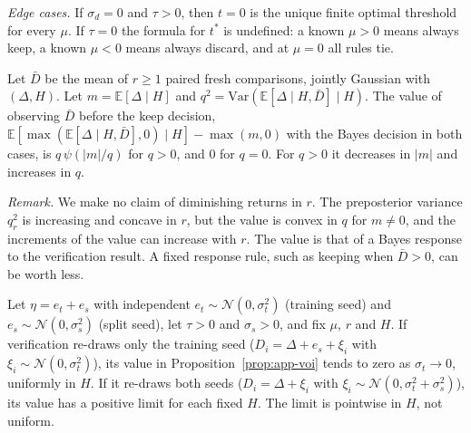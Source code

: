 \emph{Edge cases.} If $\sigma_d=0$ and $\tau>0$, then $t=0$ is the unique finite optimal threshold for every $\mu$. If $\tau=0$ the formula for $t^*$ is undefined: a known $\mu>0$ means always keep, a known $\mu<0$ means always discard, and at $\mu=0$ all rules tie.

\begin{proposition}\label{prop:app-voi}
Let $\bar D$ be the mean of $r\ge1$ paired fresh comparisons, jointly Gaussian with $(\Delta,H)$. Let $m=\mathbb{E}[\Delta\mid H]$ and $q^2=\mathrm{Var}(\mathbb{E}[\Delta\mid H,\bar D]\mid H)$. The value of observing $\bar D$ before the keep decision, $\mathbb{E}[\max(\mathbb{E}[\Delta\mid H,\bar D],0)\mid H]-\max(m,0)$ with the Bayes decision in both cases, is $q\,\psi(|m|/q)$ for $q>0$, and $0$ for $q=0$. For $q>0$ it decreases in $|m|$ and increases in $q$.
\end{proposition}

\emph{Remark.} We make no claim of diminishing returns in $r$. The preposterior variance $q_r^2$ is increasing and concave in $r$, but the value is convex in $q$ for $m\neq0$, and the increments of the value can increase with $r$. The value is that of a Bayes response to the verification result. A fixed response rule, such as keeping when $\bar D>0$, can be worth less.

\begin{proposition}\label{prop:app-split}
Let $\eta=e_t+e_s$ with independent $e_t\sim\mathcal{N}(0,\sigma_t^2)$ (training seed) and $e_s\sim\mathcal{N}(0,\sigma_s^2)$ (split seed), let $\tau>0$ and $\sigma_s>0$, and fix $\mu$, $r$ and $H$. If verification re-draws only the training seed ($D_i=\Delta+e_s+\xi_i$ with $\xi_i\sim\mathcal{N}(0,\sigma_t^2)$), its value in Proposition~\ref{prop:app-voi} tends to zero as $\sigma_t\to0$, uniformly in $H$. If it re-draws both seeds ($D_i=\Delta+\xi_i$ with $\xi_i\sim\mathcal{N}(0,\sigma_t^2+\sigma_s^2)$), its value has a positive limit for each fixed $H$. The limit is pointwise in $H$, not uniform.
\end{proposition}

